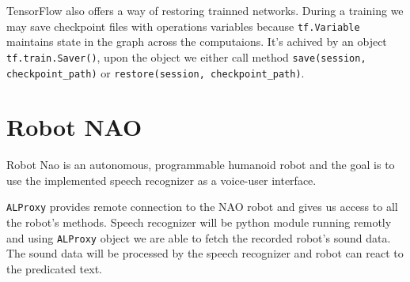 TensorFlow also offers a way of restoring trainned networks. During a training we may save checkpoint files with operations variables because \texttt{tf.Variable} maintains state in the graph across the computaions.
It's achived by an object \texttt{tf.train.Saver()}, upon the object we either call method \texttt{save(session, checkpoint\_path)} or \texttt{restore(session, checkpoint\_path)}.

\section{Robot NAO}

Robot Nao is an autonomous, programmable humanoid robot and the goal is to use the implemented speech recognizer as a voice-user interface.


\texttt{ALProxy} provides remote connection to the NAO robot and gives us access to all the robot's methods.
Speech recognizer will be python module running remotly and using \texttt{ALProxy} object we are able to fetch the recorded robot's sound data.
The sound data will be processed by the speech recognizer and robot can react to the predicated text.
